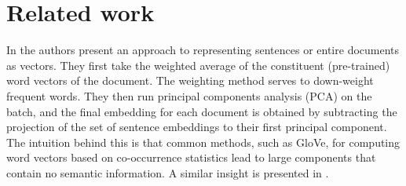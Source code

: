 \section{Related work}
In \citep{arora2017asimple} the authors present an approach to representing sentences or entire documents as vectors. They first take the weighted average of the constituent (pre-trained) word vectors of the document. The weighting method serves to down-weight frequent words. They then run principal components analysis (PCA) on the batch, and the final embedding for each document is obtained by subtracting the projection of the set of sentence embeddings to their first principal component. The intuition behind this is that common methods, such as GloVe, for computing word vectors based on co-occurrence statistics lead to large components that contain no semantic information. A similar insight is presented in \citep{arora2017asimple}.